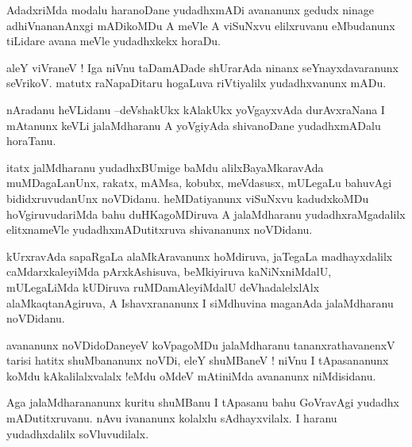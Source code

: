 \documentclass{article}
\begin{document}
\begin{mn}%
AdadxriMda modalu haranoDane yudadhxmADi avananunx gedudx ninage adhiVnananAnxgi mADikoMDu A 
meVle A viSuNxvu elilxruvanu eMbudanunx tiLidare avana meVle yudadhxkekx horaDu.
\end{mn}

\begin{mn}%
aleY viVraneV ! Iga niVnu taDamADade shUrarAda ninanx seYnayxdavaranunx seVrikoV. matutx 
raNapaDitaru hogaLuva riVtiyalilx yudadhxvanunx mADu.
\end{mn}

\begin{mn}%
nAradanu heVLidanu --deVshakUkx kAlakUkx yoVgayxvAda durAvxraNana I mAtanunx keVLi 
jalaMdharanu A yoVgiyAda shivanoDane yudadhxmADalu horaTanu.
\end{mn}


\begin{mn}%
itatx jalMdharanu yudadhxBUmige baMdu alilxBayaMkaravAda muMDagaLanUnx, rakatx, mAMsa, 
kobubx, meVdasusx, mULegaLu bahuvAgi bididxruvudanUnx noVDidanu. heMDatiyanunx viSuNxvu 
kadudxkoMDu hoVgiruvudariMda bahu duHKagoMDiruva A jalaMdharanu yudadhxraMgadalilx 
elitxnameVle yudadhxmADutitxruva shivananunx noVDidanu.
\end{mn}

\begin{mn}%
kUrxravAda sapaRgaLa alaMkAravanunx hoMdiruva, jaTegaLa madhayxdalilx caMdarxkaleyiMda 
pArxkAshisuva, beMkiyiruva kaNiNxniMdalU, mULegaLiMda kUDiruva ruMDamAleyiMdalU 
deVhadalelxlAlx alaMkaqtanAgiruva, A Ishavxrananunx I siMdhuvina maganAda jalaMdharanu 
noVDidanu.
\end{mn}

\begin{mn}%
avananunx noVDidoDaneyeV koVpagoMDu jalaMdharanu tananxrathavanenxV tarisi hatitx 
shuMbananunx noVDi, eleY shuMBaneV ! niVnu I tApasananunx koMdu kAkalilalxvalalx !eMdu 
oMdeV mAtiniMda avananunx niMdisidanu.
\end{mn}

\begin{mn}%
Aga jalaMdharananunx kuritu shuMBanu I tApasanu bahu GoVravAgi yudadhx mADutitxruvanu. nAvu 
ivananunx kolalxlu sAdhayxvilalx. I haranu yudadhxdalilx soVluvudilalx.
\end{mn}
\end{document}
